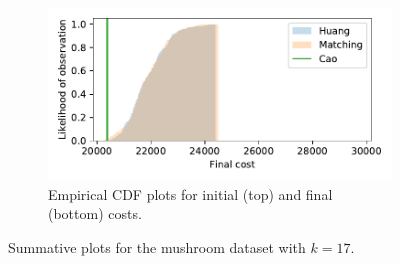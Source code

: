 \documentclass[11pt]{article}
\begin{document}
\begin{figure}
\begin{subfigure}{.5\textwidth}
        \includegraphics[width=\linewidth]{Fig2b2.pdf}
        \caption{Empirical CDF plots for initial (top) and final (bottom)
                 costs.}
    \end{subfigure}
    \caption{Summative plots for the mushroom dataset with \(k=17\).}%
    \label{fig:mushroom_knee}
\end{figure}
\end{document}
